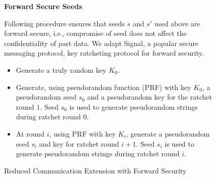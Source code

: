 \begin{figure}
\begin{mdframed}[style=myframe]
\vspace{4pt}

\textbf{Forward Secure Seeds}
\vspace{4pt}

Following procedure ensures that seeds $s$ and $s'$ used above are forward
	secure, i.e., compromise of seed does not affect the confidentiality of past
	data. We adapt Signal, a popular secure messaging protocol, key ratcheting
	protocol for forward security.

\begin{itemize}[leftmargin=*,itemsep=4pt,topsep=4pt]

	\item Generate a truly random key $K_0$.

	\item Generate, using pseudorandom function (PRF) with key $K_0$, a
		pseudorandom seed $s_0$ and a pseudorandom key for the ratchet round $1$.
		Seed $s_0$ is used to generate pseudorandom strings during ratchet round
		$0$.

	\item At round $i$, using PRF with key $K_i$, generate a pseudorandom seed
		$s_i$ and key for ratchet round $i+1$. Seed $s_i$ is used to generate
		pseudorandom strings during ratchet round $i$.

\end{itemize}

\end{mdframed}
\caption{Reduced Communication Extension with Forward Security}
\label{fig:extended_protocol}
\end{figure}
